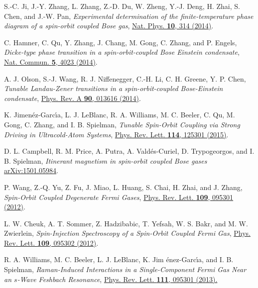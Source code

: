 \documentclass[twocolumn,pra,unsortedaddress,showpacs,floatfix,citeautoscript,nofootinbib]{revtex4-1}
\begin{document}
\begin{thebibliography}{99}
S.-C. Ji, J.-Y. Zhang, L. Zhang, Z.-D. Du, W. Zheng, Y.-J. Deng, H. Zhai, S. Chen, and J.-W.
Pan, \emph{Experimental determination of the finite-temperature
phase diagram of a spin-orbit coupled Bose gas},
\href{http://dx.doi.org/10.1038/nphys2905}{Nat. Phys. \textbf{10},
314 (2014)}.

 C. Hamner, C. Qu, Y. Zhang, J. Chang, M. Gong, C.
Zhang, and P. Engels, \emph{Dicke-type phase transition in a
spin-orbit-coupled Bose Einstein condensate}, \href{http://dx.doi.org/10.1038/ncomms5023}{Nat.
Commun. \textbf{5}, 4023 (2014)}.

 A. J. Olson, S.-J. Wang, R. J. Niffenegger, C.-H. Li, C.
H. Greene, Y. P. Chen, \emph{Tunable Landau-Zener transitions in a
spin-orbit-coupled Bose-Einstein condensate}, \href{http://dx.doi.org/10.1103/PhysRevA.90.013616}{
Phys. Rev. A \textbf{90}, 013616 (2014)}.

 K. Jimen\'{e}z-Garc\'{\i}a, L. J. LeBlanc, R. A.
Williams, M. C. Beeler, C. Qu, M. Gong, C. Zhang, and I. B. Spielman,
\emph{Tunable Spin-Orbit Coupling via Strong Driving in Ultracold-Atom Systems}, \href{http://dx.doi.org/10.1103/PhysRevLett.114.125301}%
{Phys. Rev. Lett. \textbf{114}, 125301 (2015)}.

D. L. Campbell, R. M. Price, A. Putra, A. Vald\'es-Curiel, D. Trypogeorgos, and I. B.
Spielman, \emph{Itinerant magnetism in spin-orbit coupled Bose
gases} \href{http://arxiv.org/abs/1501.05984}{arXiv:1501.05984}.


 P. Wang, Z.-Q. Yu, Z. Fu, J. Miao, L. Huang, S. Chai, H.
Zhai, and J. Zhang, \emph{Spin-Orbit Coupled Degenerate Fermi
Gases}, \href{http://dx.doi.org/10.1103/PhysRevLett.109.095301}{
Phys. Rev. Lett. \textbf{109}, 095301 (2012)}.

 L. W. Cheuk, A. T. Sommer, Z. Hadzibabic, T. Yefsah, W.
S. Bakr, and M. W. Zwierlein, \emph{Spin-Injection Spectroscopy of
a Spin-Orbit Coupled Fermi Gas}, \href{http://dx.doi.org/10.1103/PhysRevLett.109.095302}%
{Phys. Rev. Lett. \textbf{109}, 095302 (2012)}.

 R. A. Williams, M. C. Beeler, L. J. LeBlanc, K. Jim%
\'{e}nez-Garc\'{\i}a, and I. B. Spielman, \emph{Raman-Induced
Interactions in a Single-Component Fermi Gas Near an $s$-Wave
Feshbach Resonance}, \href{http://dx.doi.org/10.1103/PhysRevLett.111.095301}%
{Phys. Rev. Lett. \textbf{111}, 095301 (2013).}


\end{thebibliography}
\end{document}
